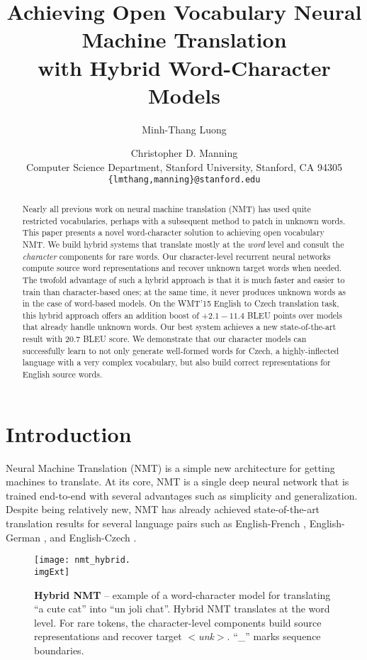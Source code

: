 \documentclass[11pt]{article}
\title{Achieving Open Vocabulary Neural Machine Translation \\ with Hybrid Word-Character Models}
\author{Minh-Thang Luong \and Christopher D. Manning\\
        Computer Science Department, Stanford University, Stanford, CA 94305 \\
	    {\tt \{lmthang,manning\}@stanford.edu}
}
\date{}
\newcommand{\imgExt}{eps}
\newcommand{\word}[1]{``#1''}
\newcommand{\unk}{$<${\it unk}$>$}
\newcommand{\ensbleu}{20.7}
\newcommand{\gain}{2.1{-}11.4}
\begin{document}
\maketitle

\begin{abstract}
Nearly all previous work on neural machine translation (NMT) has used quite restricted
vocabularies, perhaps with a subsequent method to patch in unknown words. This
paper presents a novel word-character solution to achieving open vocabulary NMT. 
We build hybrid systems that translate mostly at the {\it word}
level and consult the {\it character} components for rare words. 
Our character-level recurrent neural networks compute source
word representations and recover unknown target words when needed.
The twofold advantage of such a hybrid approach is that it is much faster and easier to
train than character-based ones; at the same time, it never produces unknown words as in the case of word-based models. 
On the WMT'15 English to Czech translation task, 
this hybrid approach offers an addition boost of +$\gain{}$ BLEU points over models 
that already handle unknown words. 
Our best system achieves a new state-of-the-art result with
$\ensbleu{}$ BLEU score.
We demonstrate that our character models can successfully learn to not only generate well-formed words for Czech, a
highly-inflected language with a very complex vocabulary, but also build correct
representations for English source words.
\end{abstract}

\section{Introduction}
\label{sec:intro}
Neural Machine Translation (NMT) is a simple new architecture for getting
machines to translate. At its core, NMT is a single deep 
neural network that is trained end-to-end with several advantages such as
simplicity and generalization. Despite being relatively new, NMT has already
achieved state-of-the-art translation results for several language pairs 
such as English-French \cite{luong15}, English-German
\cite{jean15,luong15attn,luong15iwslt}, and English-Czech \cite{jean15wmt}. 
\begin{figure}%
\centering
\texttt{[image: nmt\_hybrid.\\imgExt]}
\caption{{\bf Hybrid NMT} -- example of a word-character model for translating
\word{a cute cat} into \word{un
joli chat}. Hybrid NMT translates at the word level. For rare tokens,
the character-level components build source representations
and recover target \unk{}. \word{\_} marks sequence
boundaries.}
\label{f:hybrid}
\end{figure}
\end{document}
